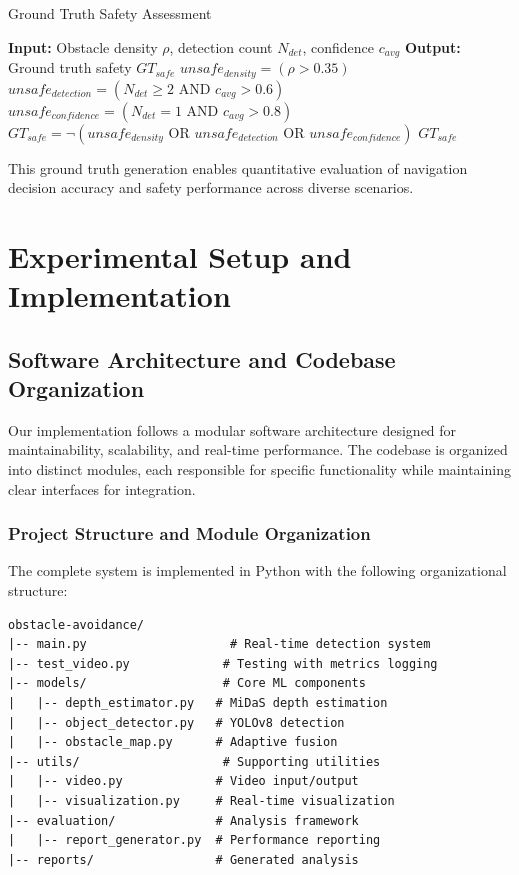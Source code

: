 \documentclass[10pt]{article}
\begin{document}
\begin{algorithm}
\caption{Ground Truth Safety Assessment}
\begin{algorithmic}
\STATE \textbf{Input:} Obstacle density $\rho$, detection count $N_{det}$, confidence $c_{avg}$
\STATE \textbf{Output:} Ground truth safety $GT_{safe}$
\STATE $unsafe_{density} = (\rho > 0.35)$
\STATE $unsafe_{detection} = (N_{det} \geq 2 \text{ AND } c_{avg} > 0.6)$
\STATE $unsafe_{confidence} = (N_{det} = 1 \text{ AND } c_{avg} > 0.8)$
\STATE $GT_{safe} = \neg(unsafe_{density} \text{ OR } unsafe_{detection} \text{ OR } unsafe_{confidence})$
\RETURN $GT_{safe}$
\end{algorithmic}
\end{algorithm}

This ground truth generation enables quantitative evaluation of navigation decision accuracy and safety performance across diverse scenarios.

\section{Experimental Setup and Implementation}

\subsection{Software Architecture and Codebase Organization}

Our implementation follows a modular software architecture designed for maintainability, scalability, and real-time performance. The codebase is organized into distinct modules, each responsible for specific functionality while maintaining clear interfaces for integration.

\subsubsection{Project Structure and Module Organization}

The complete system is implemented in Python with the following organizational structure:

\begin{verbatim}
obstacle-avoidance/
|-- main.py                    # Real-time detection system
|-- test_video.py             # Testing with metrics logging
|-- models/                   # Core ML components
|   |-- depth_estimator.py   # MiDaS depth estimation
|   |-- object_detector.py   # YOLOv8 detection
|   |-- obstacle_map.py      # Adaptive fusion
|-- utils/                    # Supporting utilities
|   |-- video.py             # Video input/output
|   |-- visualization.py     # Real-time visualization
|-- evaluation/              # Analysis framework
|   |-- report_generator.py  # Performance reporting
|-- reports/                 # Generated analysis
\end{verbatim}
\end{document}
